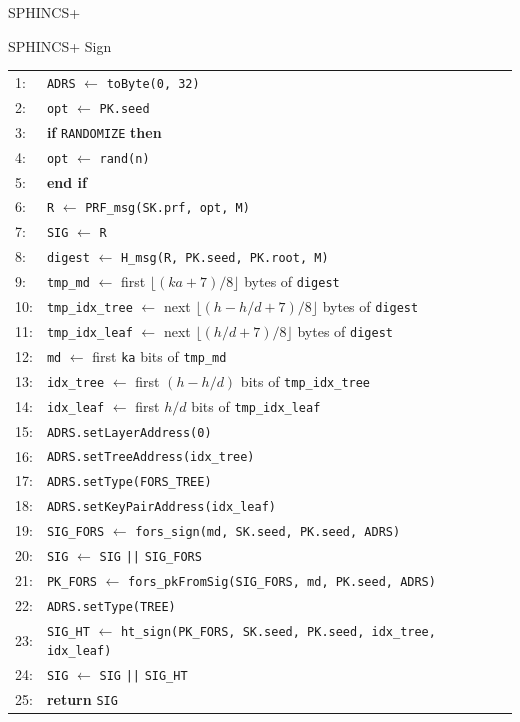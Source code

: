 \documentclass[version=preprint]{iacrcc}
\begin{document}
\begin{section}{SPHINCS+}
\begin{subsection}{SPHINCS+ Sign}
\begin{algorithm}
    \begin{tabular}{ll}
    1:  & \texttt{ADRS} $\leftarrow$ \texttt{toByte(0, 32)} \\
    2:  & \texttt{opt}  $\leftarrow$ \texttt{PK.seed} \\
    3:  & \textbf{if} \texttt{RANDOMIZE} \textbf{then} \\
    4:  & \quad \texttt{opt}  $\leftarrow$ \texttt{rand(n)} \\
    5:  & \textbf{end if} \\
    6:  & \texttt{R}    $\leftarrow$ \texttt{PRF\_msg(SK.prf, opt, M)} \\
    7:  & \texttt{SIG}  $\leftarrow$ \texttt{R} \\
    8:  & \texttt{digest} $\leftarrow$ \texttt{H\_msg(R, PK.seed, PK.root, M)} \\
    9:  & \texttt{tmp\_md}       $\leftarrow$ first $\lfloor(\mathit{ka}+7)/8\rfloor$ bytes of \texttt{digest} \\
    10: & \texttt{tmp\_idx\_tree} $\leftarrow$ next $\lfloor(h - h/d +7)/8\rfloor$ bytes of \texttt{digest} \\
    11: & \texttt{tmp\_idx\_leaf} $\leftarrow$ next $\lfloor(h/d +7)/8\rfloor$ bytes of \texttt{digest} \\
    12: & \texttt{md}      $\leftarrow$ first \texttt{ka} bits of \texttt{tmp\_md} \\
    13: & \texttt{idx\_tree} $\leftarrow$ first $(h - h/d)$ bits of \texttt{tmp\_idx\_tree} \\
    14: & \texttt{idx\_leaf} $\leftarrow$ first $h/d$ bits of \texttt{tmp\_idx\_leaf} \\
    15: & \texttt{ADRS.setLayerAddress(0)} \\
    16: & \texttt{ADRS.setTreeAddress(idx\_tree)} \\
    17: & \texttt{ADRS.setType(FORS\_TREE)} \\
    18: & \texttt{ADRS.setKeyPairAddress(idx\_leaf)} \\
    19: & \texttt{SIG\_FORS} $\leftarrow$ \texttt{fors\_sign(md, SK.seed, PK.seed, ADRS)} \\
    20: & \texttt{SIG}      $\leftarrow$ \texttt{SIG} \texttt{||} \texttt{SIG\_FORS} \\
    21: & \texttt{PK\_FORS} $\leftarrow$ \texttt{fors\_pkFromSig(SIG\_FORS, md, PK.seed, ADRS)} \\
    22: & \texttt{ADRS.setType(TREE)} \\
    23: & \texttt{SIG\_HT}   $\leftarrow$ \texttt{ht\_sign(PK\_FORS, SK.seed, PK.seed, idx\_tree, idx\_leaf)} \\
    24: & \texttt{SIG}      $\leftarrow$ \texttt{SIG} \texttt{||} \texttt{SIG\_HT} \\
    25: & \textbf{return} \texttt{SIG}
    \end{tabular}
\end{algorithm}




\end{subsection}
\end{section}
\end{document}
